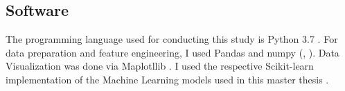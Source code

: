 \subsection{Software}
The programming language used for conducting this study is Python 3.7 \cite{python2020}.
For data preparation and feature engineering, I used Pandas and numpy (\cite{pandas2020}, \cite{numpy2020}).
Data Visualization was done via Maplotllib \cite{matplotlib2020}.
I used the respective Scikit-learn implementation of the Machine Learning models used in this master thesis \cite{scikit2020}. 
